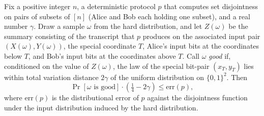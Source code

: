 \begin{theorem}
\label{CommunicationComplexity.Functions.Disjointness.RandomizedLowerBound.goodZEvent_mul_quarter_sub_two_mul_le_distributionalError}
\leanok
{}
Fix a positive integer $n$, a deterministic protocol $p$ that computes set disjointness
on pairs of subsets of $[n]$ (Alice and Bob each holding one subset), and a real number
$\gamma$. Draw a sample $\omega$ from the hard distribution, and let $Z(\omega)$ be the
summary consisting of the transcript that $p$ produces on the associated input pair
$(X(\omega),Y(\omega))$, the special coordinate $T$, Alice's input bits at the
coordinates below $T$, and Bob's input bits at the coordinates above $T$. Call $\omega$
\emph{good} if, conditioned on the value of $Z(\omega)$, the law of the special bit-pair
$(x_T,y_T)$ lies within total variation distance $2\gamma$ of the uniform distribution
on $\{0,1\}^2$. Then
\[
\Pr[\omega \text{ is good}]\cdot\left(\tfrac14 - 2\gamma\right) \le \mathrm{err}(p),
\]
where $\mathrm{err}(p)$ is the distributional error of $p$ against the disjointness
function under the input distribution induced by the hard distribution.
\end{theorem}

